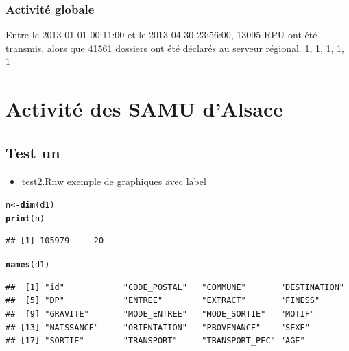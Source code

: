 \documentclass[12pt,english,french]{report}\usepackage{graphicx, color}
\makeatletter
\newcommand{\hlfunctioncall}[1]{\textcolor[rgb]{0.501960784313725,0,0.329411764705882}{\textbf{#1}}}%
\newenvironment{kframe}{%
 \def\at@end@of@kframe{}%
 \ifinner\ifhmode%
  \def\at@end@of@kframe{\end{minipage}}%
  \begin{minipage}{\columnwidth}%
 \fi\fi%
 \def\FrameCommand##1{\hskip\@totalleftmargin \hskip-\fboxsep
 \colorbox{shadecolor}{##1}\hskip-\fboxsep
     \hskip-\linewidth \hskip-\@totalleftmargin \hskip\columnwidth}%
 \MakeFramed {\advance\hsize-\width
   \@totalleftmargin\z@ \linewidth\hsize
   \@setminipage}}%
 {\par\unskip\endMakeFramed%
 \at@end@of@kframe}
\newenvironment{knitrout}{}{} %
\makeatother
\begin{document}
\section{Activité globale}




Entre le 2013-01-01 00:11:00 et le 2013-04-30 23:56:00, 13095 RPU ont été transmis, alors que 41561 dossiers ont été déclarés au serveur régional. 
1, 1, 1, 1, 1



\part{Activité des SAMU d'Alsace}

\chapter{Test un}

\begin{itemize}
  \item test2.Rnw exemple de graphiques avec label
\end{itemize}

\begin{knitrout}
\color{fgcolor}\begin{kframe}
\begin{alltt}
n <- \hlfunctioncall{dim}(d1)
\hlfunctioncall{print}(n)
\end{alltt}
\begin{verbatim}
## [1] 105979     20
\end{verbatim}
\begin{alltt}
\hlfunctioncall{names}(d1)
\end{alltt}
\begin{verbatim}
##  [1] "id"            "CODE_POSTAL"   "COMMUNE"       "DESTINATION"  
##  [5] "DP"            "ENTREE"        "EXTRACT"       "FINESS"       
##  [9] "GRAVITE"       "MODE_ENTREE"   "MODE_SORTIE"   "MOTIF"        
## [13] "NAISSANCE"     "ORIENTATION"   "PROVENANCE"    "SEXE"         
## [17] "SORTIE"        "TRANSPORT"     "TRANSPORT_PEC" "AGE"
\end{verbatim}
\end{kframe}
\end{knitrout}
\end{document}
